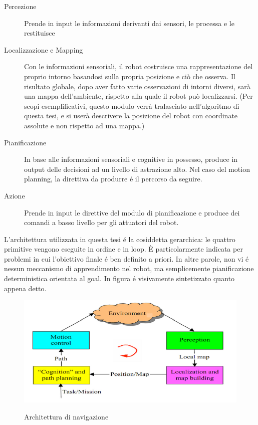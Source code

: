 \documentclass[14pt,a4paper]{extarticle}
\begin{document}
\begin{description}
\item[Percezione] Prende in input le informazioni derivanti dai sensori, le processa e le restituisce
\item[Localizzazione e Mapping] Con le informazioni sensoriali, il robot costruisce una rappresentazione del proprio intorno basandosi sulla propria posizione e ciò che osserva. Il risultato globale, dopo aver fatto varie osservazioni di intorni diversi, sarà una mappa dell'ambiente, rispetto alla quale il robot può localizzarsi. (Per scopi esemplificativi, questo modulo verrà tralasciato nell'algoritmo di questa tesi, e si userà descrivere la posizione del robot con coordinate assolute e non rispetto ad una mappa.)
\item[Pianificazione] In base alle informazioni sensoriali e cognitive in possesso, produce in output delle decisioni ad un livello di astrazione alto. Nel caso del motion planning, la direttiva da produrre é il percorso da seguire.
\item[Azione] Prende in input le direttive del modulo di pianificazione e produce dei comandi a basso livello per gli attuatori del robot.
\end{description}
L'architettura utilizzata in questa tesi é la cosiddetta gerarchica: le quattro primitive vengono eseguite in ordine e in loop. È particolarmente indicata per problemi in cui l'obiettivo finale é ben definito a priori. In altre parole, non vi é nessun meccanismo di apprendimento nel robot, ma semplicemente pianificazione deterministica orientata al goal. In figura é visivamente sintetizzato quanto appena detto.

\begin{figure}[H]
\caption{Architettura di navigazione\cite{mac2016}}
\centering
\includegraphics[scale=0.8]{architetturaNavigazione.png}
\label{arch}
\end{figure}
\end{document}
